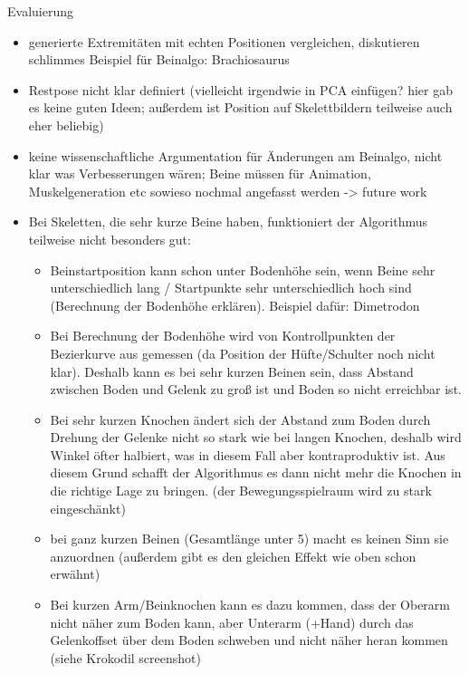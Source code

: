Evaluierung 
\begin{itemize}
 \item generierte Extremitäten mit echten Positionen vergleichen, diskutieren\\
    schlimmes Beispiel für Beinalgo: Brachiosaurus
 \item Restpose nicht klar definiert (vielleicht irgendwie in PCA einfügen? hier gab es keine guten Ideen; außerdem ist Position auf Skelettbildern teilweise auch eher beliebig)
 \item keine wissenschaftliche Argumentation für Änderungen am Beinalgo, nicht klar was Verbesserungen wären; Beine müssen für Animation, Muskelgeneration etc sowieso nochmal angefasst werden -> future work
 \item Bei Skeletten, die sehr kurze Beine haben, funktioniert der Algorithmus teilweise nicht besonders gut:
  \begin{itemize}
   \item Beinstartposition kann schon unter Bodenhöhe sein, wenn Beine sehr unterschiedlich lang / Startpunkte sehr unterschiedlich hoch sind (Berechnung der Bodenhöhe erklären). Beispiel dafür: Dimetrodon
   \item Bei Berechnung der Bodenhöhe wird von Kontrollpunkten der Bezierkurve aus gemessen (da Position der Hüfte/Schulter noch nicht klar). Deshalb kann es bei sehr kurzen Beinen sein, dass Abstand zwischen Boden und Gelenk zu groß ist und Boden so nicht erreichbar ist.
   \item Bei sehr kurzen Knochen ändert sich der Abstand zum Boden durch Drehung der Gelenke nicht so stark wie bei langen Knochen, deshalb wird Winkel öfter halbiert, was in diesem Fall aber kontraproduktiv ist. Aus diesem Grund schafft der Algorithmus es dann nicht mehr die Knochen in die richtige Lage zu bringen. (der Bewegungsspielraum wird zu stark eingeschänkt)
   \item bei ganz kurzen Beinen (Gesamtlänge unter 5) macht es keinen Sinn sie anzuordnen (außerdem gibt es den gleichen Effekt wie oben schon erwähnt)
   \item Bei kurzen Arm/Beinknochen kann es dazu kommen, dass der Oberarm nicht näher zum Boden kann, aber Unterarm (+Hand) durch das Gelenkoffset über dem Boden schweben und nicht näher heran kommen (siehe Krokodil screenshot)
  \end{itemize}

\end{itemize}



